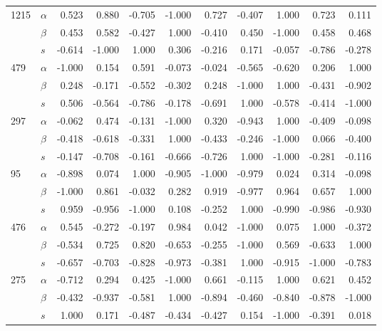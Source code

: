 \begin{longtable}{llrrrrrrrrr}
\cline{1-11}
\multirow{3}{*}{1215} & $\alpha$ &  0.523 &  0.880 & -0.705 & -1.000 &  0.727 & -0.407 &  1.000 &  0.723 &  0.111 \\
     & $\beta$ &  0.453 &  0.582 & -0.427 &  1.000 & -0.410 &  0.450 & -1.000 &  0.458 &  0.468 \\
     & $s$ & -0.614 & -1.000 &  1.000 &  0.306 & -0.216 &  0.171 & -0.057 & -0.786 & -0.278 \\
\cline{1-11}
\multirow{3}{*}{479} & $\alpha$ & -1.000 &  0.154 &  0.591 & -0.073 & -0.024 & -0.565 & -0.620 &  0.206 &  1.000 \\
     & $\beta$ &  0.248 & -0.171 & -0.552 & -0.302 &  0.248 & -1.000 &  1.000 & -0.431 & -0.902 \\
     & $s$ &  0.506 & -0.564 & -0.786 & -0.178 & -0.691 &  1.000 & -0.578 & -0.414 & -1.000 \\
\cline{1-11}
\multirow{3}{*}{297} & $\alpha$ & -0.062 &  0.474 & -0.131 & -1.000 &  0.320 & -0.943 &  1.000 & -0.409 & -0.098 \\
     & $\beta$ & -0.418 & -0.618 & -0.331 &  1.000 & -0.433 & -0.246 & -1.000 &  0.066 & -0.400 \\
     & $s$ & -0.147 & -0.708 & -0.161 & -0.666 & -0.726 &  1.000 & -1.000 & -0.281 & -0.116 \\
\cline{1-11}
\multirow{3}{*}{95} & $\alpha$ & -0.898 &  0.074 &  1.000 & -0.905 & -1.000 & -0.979 &  0.024 &  0.314 & -0.098 \\
     & $\beta$ & -1.000 &  0.861 & -0.032 &  0.282 &  0.919 & -0.977 &  0.964 &  0.657 &  1.000 \\
     & $s$ &  0.959 & -0.956 & -1.000 &  0.108 & -0.252 &  1.000 & -0.990 & -0.986 & -0.930 \\
\cline{1-11}
\multirow{3}{*}{476} & $\alpha$ &  0.545 & -0.272 & -0.197 &  0.984 &  0.042 & -1.000 &  0.075 &  1.000 & -0.372 \\
     & $\beta$ & -0.534 &  0.725 &  0.820 & -0.653 & -0.255 & -1.000 &  0.569 & -0.633 &  1.000 \\
     & $s$ & -0.657 & -0.703 & -0.828 & -0.973 & -0.381 &  1.000 & -0.915 & -1.000 & -0.783 \\
\cline{1-11}
\multirow{3}{*}{275} & $\alpha$ & -0.712 &  0.294 &  0.425 & -1.000 &  0.661 & -0.115 &  1.000 &  0.621 &  0.452 \\
     & $\beta$ & -0.432 & -0.937 & -0.581 &  1.000 & -0.894 & -0.460 & -0.840 & -0.878 & -1.000 \\
     & $s$ &  1.000 &  0.171 & -0.487 & -0.434 & -0.427 &  0.154 & -1.000 & -0.391 &  0.018 \\

\end{longtable}
